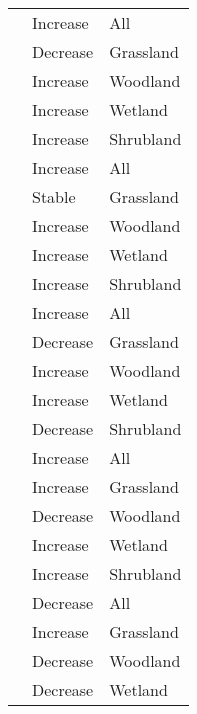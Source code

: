 \documentclass[
  12pt,
  oneside]{report}
\begin{document}
\begin{landscape}
\begin{longtable}[t]{ll>{\raggedright\arraybackslash}p{40em}}
\cite{schipper_contrasting_2016} & Increase & \vphantom{4} All\\
\cite{schipper_contrasting_2016} & Decrease & \vphantom{1} Grassland\\
\cite{schipper_contrasting_2016} & Increase & \vphantom{3} Woodland\\
\addlinespace
\cite{schipper_contrasting_2016} & Increase & \vphantom{4} Wetland\\
\cite{schipper_contrasting_2016} & Increase & \vphantom{2} Shrubland\\
\cite{schipper_contrasting_2016} & Increase & \vphantom{3} All\\
\cite{schipper_contrasting_2016} & Stable & Grassland\\
\cite{schipper_contrasting_2016} & Increase & \vphantom{2} Woodland\\
\addlinespace
\cite{schipper_contrasting_2016} & Increase & \vphantom{3} Wetland\\
\cite{schipper_contrasting_2016} & Increase & \vphantom{1} Shrubland\\
\cite{schipper_contrasting_2016} & Increase & \vphantom{2} All\\
\cite{schipper_contrasting_2016} & Decrease & Grassland\\
\cite{schipper_contrasting_2016} & Increase & \vphantom{1} Woodland\\
\addlinespace
\cite{schipper_contrasting_2016} & Increase & \vphantom{2} Wetland\\
\cite{schipper_contrasting_2016} & Decrease & \vphantom{2} Shrubland\\
\cite{schipper_contrasting_2016} & Increase & \vphantom{1} All\\
\cite{schipper_contrasting_2016} & Increase & \vphantom{2} Grassland\\
\cite{schipper_contrasting_2016} & Decrease & \vphantom{1} Woodland\\
\addlinespace
\cite{schipper_contrasting_2016} & Increase & \vphantom{1} Wetland\\
\cite{schipper_contrasting_2016} & Increase & Shrubland\\
\cite{schipper_contrasting_2016} & Decrease & All\\
\cite{schipper_contrasting_2016} & Increase & \vphantom{1} Grassland\\
\cite{schipper_contrasting_2016} & Decrease & Woodland\\
\addlinespace
\cite{schipper_contrasting_2016} & Decrease & Wetland\\

\end{longtable}
\end{landscape}
\end{document}
